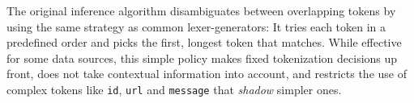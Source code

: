 


The original inference algorithm disambiguates between overlapping
tokens by using the same strategy as common lexer-generators:  It
tries each token in a predefined order 
and picks the first, longest token that matches.
While effective for some data sources, this simple policy 
makes fixed tokenization decisions up front,
does not take contextual information into account, and 
restricts the use of complex tokens like {\tt id}, {\tt url} and 
{\tt message} that {\em shadow} simpler ones.

